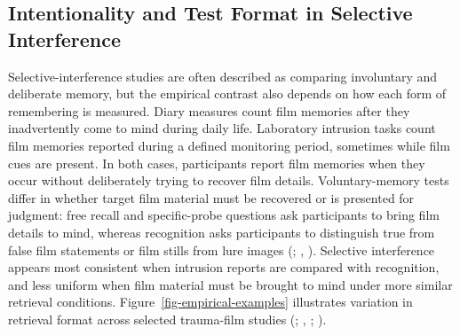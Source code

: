 \documentclass[
  man,
  floatsintext,
  longtable,
  nolmodern,
  notxfonts,
  notimes,
  draftfirst,
  colorlinks=true,linkcolor=blue,citecolor=blue,urlcolor=blue]{apa7}
\begin{document}
\subsection{Intentionality and Test Format in Selective
Interference}\label{intentionality-and-test-format-in-selective-interference}

Selective-interference studies are often described as comparing
involuntary and deliberate memory, but the empirical contrast also
depends on how each form of remembering is measured. Diary measures
count film memories after they inadvertently come to mind during daily
life. Laboratory intrusion tasks count film memories reported during a
defined monitoring period, sometimes while film cues are present. In
both cases, participants report film memories when they occur without
deliberately trying to recover film details. Voluntary-memory tests
differ in whether target film material must be recovered or is presented
for judgment: free recall and specific-probe questions ask participants
to bring film details to mind, whereas recognition asks participants to
distinguish true from false film statements or film stills from lure
images (;
,
). Selective interference appears
most consistent when intrusion reports are compared with recognition,
and less uniform when film material must be brought to mind under more
similar retrieval conditions. Figure~\ref{fig-empirical-examples}
illustrates variation in retrieval format across selected trauma-film
studies (;
,
;
).
\end{document}
